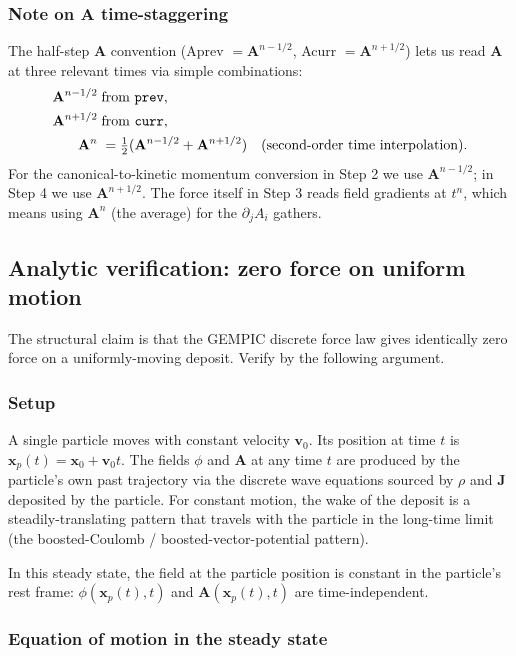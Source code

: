 \documentclass[11pt,a4paper]{article}
\newcommand{\vv}[1]{\mathbf{#1}}
\begin{document}
\subsubsection*{Note on $\vv{A}$ time-staggering}

The half-step $\vv{A}$ convention (Aprev $= \vv{A}^{n-1/2}$,
Acurr $= \vv{A}^{n+1/2}$) lets us read $\vv{A}$ at three relevant
times via simple combinations:
\begin{align}
\vv{A}^{n-1/2}\;&\text{from \texttt{prev}},\\
\vv{A}^{n+1/2}\;&\text{from \texttt{curr}},\\
\vv{A}^{n}\;&= \tfrac{1}{2}(\vv{A}^{n-1/2} + \vv{A}^{n+1/2})\quad
              \text{(second-order time interpolation)}.
\end{align}
For the canonical-to-kinetic momentum conversion in Step 2 we use
$\vv{A}^{n-1/2}$; in Step 4 we use $\vv{A}^{n+1/2}$.  The force
itself in Step 3 reads field gradients at $t^n$, which means using
$\vv{A}^n$ (the average) for the $\partial_j A_i$ gathers.

\subsection{Analytic verification: zero force on uniform motion}

The structural claim is that the GEMPIC discrete force law gives
identically zero force on a uniformly-moving deposit.  Verify by
the following argument.

\subsubsection*{Setup}

A single particle moves with constant velocity $\vv{v}_0$.  Its
position at time $t$ is $\vv{x}_p(t) = \vv{x}_0 + \vv{v}_0 t$.
The fields $\phi$ and $\vv{A}$ at any time $t$ are produced by the
particle's own past trajectory via the discrete wave equations
sourced by $\rho$ and $\vv{J}$ deposited by the particle.  For
constant motion, the wake of the deposit is a steadily-translating
pattern that travels with the particle in the long-time limit
(the boosted-Coulomb / boosted-vector-potential pattern).

In this steady state, the field at the particle position is
constant in the particle's rest frame: $\phi(\vv{x}_p(t), t)$ and
$\vv{A}(\vv{x}_p(t), t)$ are time-independent.

\subsubsection*{Equation of motion in the steady state}
\end{document}
